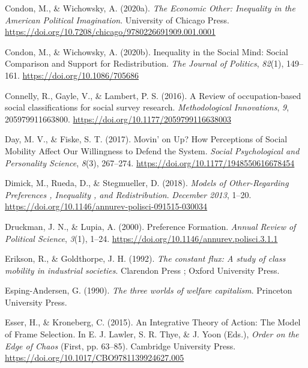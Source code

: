 \documentclass[
  12pt,
]{book}
\newlength{\cslhangindent}
\newenvironment{cslreferences}%
  {\setlength{\parindent}{0pt}%
  \everypar{\setlength{\hangindent}{\cslhangindent}}\ignorespaces}%
  {\par}
\begin{document}
\begin{cslreferences}
\leavevmode\hypertarget{ref-condon_economic_2020}{}%
Condon, M., \& Wichowsky, A. (2020a). \emph{The Economic Other: Inequality in the American Political Imagination}. University of Chicago Press. \url{https://doi.org/10.7208/chicago/9780226691909.001.0001}

\leavevmode\hypertarget{ref-Condon2020}{}%
Condon, M., \& Wichowsky, A. (2020b). Inequality in the Social Mind: Social Comparison and Support for Redistribution. \emph{The Journal of Politics}, \emph{82}(1), 149--161. \url{https://doi.org/10.1086/705686}

\leavevmode\hypertarget{ref-Connelly2016}{}%
Connelly, R., Gayle, V., \& Lambert, P. S. (2016). A Review of occupation-based social classifications for social survey research. \emph{Methodological Innovations}, \emph{9}, 205979911663800. \url{https://doi.org/10.1177/2059799116638003}

\leavevmode\hypertarget{ref-Day2017}{}%
Day, M. V., \& Fiske, S. T. (2017). Movin' on Up? How Perceptions of Social Mobility Affect Our Willingness to Defend the System. \emph{Social Psychological and Personality Science}, \emph{8}(3), 267--274. \url{https://doi.org/10.1177/1948550616678454}

\leavevmode\hypertarget{ref-dimick_models_2018}{}%
Dimick, M., Rueda, D., \& Stegmueller, D. (2018). \emph{Models of Other-Regarding Preferences , Inequality , and Redistribution}. \emph{December 2013}, 1--20. \url{https://doi.org/10.1146/annurev-polisci-091515-030034}

\leavevmode\hypertarget{ref-druckman_preference_2000}{}%
Druckman, J. N., \& Lupia, A. (2000). Preference Formation. \emph{Annual Review of Political Science}, \emph{3}(1), 1--24. \url{https://doi.org/10.1146/annurev.polisci.3.1.1}

\leavevmode\hypertarget{ref-Erikson1992}{}%
Erikson, R., \& Goldthorpe, J. H. (1992). \emph{The constant flux: A study of class mobility in industrial societies}. Clarendon Press ; Oxford University Press.

\leavevmode\hypertarget{ref-esping-andersen_three_1990}{}%
Esping-Andersen, G. (1990). \emph{The three worlds of welfare capitalism}. Princeton University Press.

\leavevmode\hypertarget{ref-esser_integrative_2015}{}%
Esser, H., \& Kroneberg, C. (2015). An Integrative Theory of Action: The Model of Frame Selection. In E. J. Lawler, S. R. Thye, \& J. Yoon (Eds.), \emph{Order on the Edge of Chaos} (First, pp. 63--85). Cambridge University Press. \url{https://doi.org/10.1017/CBO9781139924627.005}


\end{cslreferences}
\end{document}
